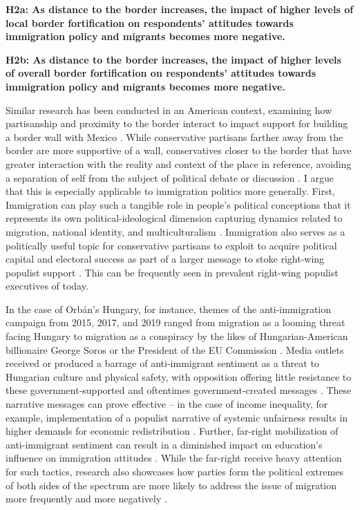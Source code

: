 \documentclass[12pt,]{article}
\begin{document}
\textbf{H2a: As distance to the border increases, the impact of higher
levels of local border fortification on respondents' attitudes towards
immigration policy and migrants becomes more negative.}

\textbf{H2b: As distance to the border increases, the impact of higher
levels of overall border fortification on respondents' attitudes towards
immigration policy and migrants becomes more negative.}

Similar research has been conducted in an American context, examining
how partisanship and proximity to the border interact to impact support
for building a border wall with Mexico \citep{cortina2020}. While
conservative partisans farther away from the border are more supportive
of a wall, conservatives closer to the border that have greater
interaction with the reality and context of the place in reference,
avoiding a separation of self from the subject of political debate or
discussion \citep{cortina2020}. I argue that this is especially
applicable to immigration politics more generally. First, Immigration
can play such a tangible role in people's political conceptions that it
represents its own political-ideological dimension capturing dynamics
related to migration, national identity, and multiculturalism
\citep{ogrady2019}. Immigration also serves as a politically useful
topic for conservative partisans to exploit to acquire political capital
and electoral success as part of a larger message to stoke right-wing
populist support \citep{dipiazza2023, kamenova2017}. This can be
frequently seen in prevalent right-wing populist executives of today.

In the case of Orbán's Hungary, for instance, themes of the
anti-immigration campaign from 2015, 2017, and 2019 ranged from
migration as a looming threat facing Hungary to migration as a
conspiracy by the likes of Hungarian-American billionaire George Soros
or the President of the EU Commission \citep{bajomi-lazar2019}. Media
outlets received or produced a barrage of anti-immigrant sentiment as a
threat to Hungarian culture and physical safety, with opposition
offering little resistance to these government-supported and oftentimes
government-created messages \citep{bajomi-lazar2019}. These narrative
messages can prove effective -- in the case of income inequality, for
example, implementation of a populist narrative of systemic unfairness
results in higher demands for economic redistribution
\citep{culpepper2024}. Further, far-right mobilization of anti-immigrant
sentiment can result in a diminished impact on education's influence on
immigration attitudes \citep{mclaren2020}. While the far-right receive
heavy attention for such tactics, research also showcases how parties
form the political extremes of both sides of the spectrum are more
likely to address the issue of migration more frequently and more
negatively \citep{heidenreich2020}.
\end{document}
